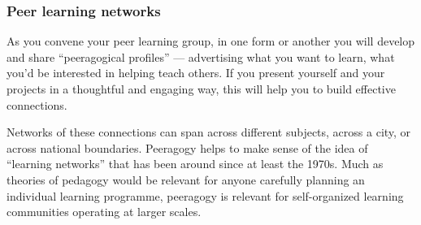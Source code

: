 \subsubsection{Peer learning networks}

As you convene your peer learning group, in one form or another you
will develop and share ``peeragogical profiles'' --- advertising what
you want to learn, what you'd be interested in helping teach others.
If you present yourself and your projects in a thoughtful and engaging
way, this will help you to build effective connections.

Networks of these connections can span across different subjects,
across a city, or across national boundaries.  Peeragogy helps to make
sense of the idea of ``learning networks'' that has been around since
at least the 1970s.  Much as theories of pedagogy would be relevant for anyone
carefully planning an individual learning programme, peeragogy is relevant for
self-organized learning communities operating at larger scales.

